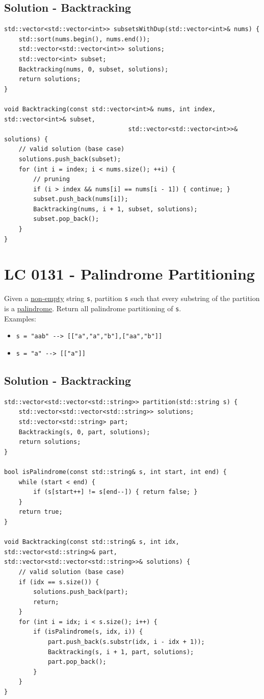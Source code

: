 \subsection*{Solution - Backtracking}
\begin{lstlisting}
std::vector<std::vector<int>> subsetsWithDup(std::vector<int>& nums) {
	std::sort(nums.begin(), nums.end());
	std::vector<std::vector<int>> solutions;
	std::vector<int> subset;
	Backtracking(nums, 0, subset, solutions);
	return solutions;
}

void Backtracking(const std::vector<int>& nums, int index, std::vector<int>& subset,
								  std::vector<std::vector<int>>& solutions) {
	// valid solution (base case)
	solutions.push_back(subset);
	for (int i = index; i < nums.size(); ++i) {
		// pruning
		if (i > index && nums[i] == nums[i - 1]) { continue; }
		subset.push_back(nums[i]);
		Backtracking(nums, i + 1, subset, solutions);
		subset.pop_back();
	}
}
\end{lstlisting}

\section{LC 0131 - Palindrome Partitioning}
Given a \ul{non-empty} string {\colorbox{CodeBackground}{\lstinline|s|}}, partition {\colorbox{CodeBackground}{\lstinline|s|}} such that every substring of the partition is a \ul{palindrome}. Return all palindrome partitioning of {\colorbox{CodeBackground}{\lstinline|s|}}.\\

Examples:
\begin{itemize}
	\item {\colorbox{CodeBackground}{\lstinline|s = "aab" --> [["a","a","b"],["aa","b"]]|}}
	\item {\colorbox{CodeBackground}{\lstinline|s = "a" --> [["a"]]|}}
\end{itemize}

\subsection*{Solution - Backtracking}
\begin{lstlisting}
std::vector<std::vector<std::string>> partition(std::string s) {
	std::vector<std::vector<std::string>> solutions;
	std::vector<std::string> part;
	Backtracking(s, 0, part, solutions);
	return solutions;
}

bool isPalindrome(const std::string& s, int start, int end) {
	while (start < end) {
		if (s[start++] != s[end--]) { return false; }
	}
	return true;
}

void Backtracking(const std::string& s, int idx, std::vector<std::string>& part,
std::vector<std::vector<std::string>>& solutions) {
	// valid solution (base case)
	if (idx == s.size()) {
		solutions.push_back(part);
		return;
	}
	for (int i = idx; i < s.size(); i++) {
		if (isPalindrome(s, idx, i)) {
			part.push_back(s.substr(idx, i - idx + 1));
			Backtracking(s, i + 1, part, solutions);
			part.pop_back();
		}
	}
}
\end{lstlisting}

